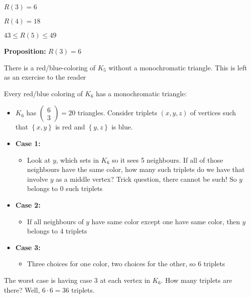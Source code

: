 \noindent $R(3) = 6$\par
\noindent $R(4) = 18$\par
\noindent $43\leq R(5)\leq 49$
\par\bigskip
\noindent\textbf{Proposition:} $R(3) = 6$\par
\noindent There is a red/blue-coloring of $K_5$ without a monochromatic triangle. This is left as an exercise to the reader
\par\bigskip
\noindent Every red/blue coloring of $K_6$ has a monochromatic triangle:\par
\begin{itemize}
  \item $K_6$ has $\begin{pmatrix}6\\3\end{pmatrix} = 20$ triangles. Consider triplets $(x,y,z)$ of vertices such that $\left\{x,y\right\}$ is red and $\left\{y,z\right\}$ is blue.
    \par\bigskip
  \item \textbf{Case 1:}\par
    \begin{itemize}
      \item Look at $y$, which sets in $K_6$ so it sees 5 neighbours. If all of those neighbours have the same color, how many such triplets do we have that involve $y$ as a middle vertex? Trick question, there cannot be such! So $y$ belongs to 0 such triplets 
    \end{itemize}
    \par\bigskip
  \item\textbf{Case 2:}\par
    \begin{itemize}
      \item If all neighbours of $y$ have same color except one have same color, then $y$ belongs to 4 triplets 
    \end{itemize}
    \par\bigskip
  \item \textbf{Case 3:}\par
    \begin{itemize}
      \item Three choices for one color, two choices for the other, so 6 triplets 
    \end{itemize}
    \par\bigskip
\end{itemize}
\par\bigskip
\noindent The worst case is having case 3 at each vertex in $K_6$. How many triplets are there? Well, $6\cdot6 = 36$ triplets.
